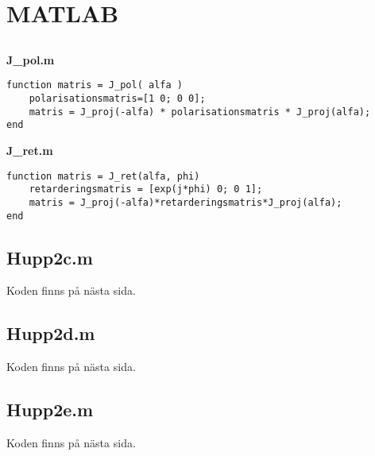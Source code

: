 \documentclass{article}
\begin{document}
\section{MATLAB}
\setcounter{subsection}{1}
\subsection{}
\textbf{J\_pol.m}
    \begin{Verbatim}
function matris = J_pol( alfa )
	polarisationsmatris=[1 0; 0 0];
	matris = J_proj(-alfa) * polarisationsmatris * J_proj(alfa);
end
\end{Verbatim}
\textbf{J\_ret.m}
    \begin{Verbatim}
function matris = J_ret(alfa, phi)
	retarderingsmatris = [exp(j*phi) 0; 0 1];
	matris = J_proj(-alfa)*retarderingsmatris*J_proj(alfa);
end
\end{Verbatim}
\subsection{Hupp2c.m}
Koden finns på nästa sida.


\subsection{Hupp2d.m}
Koden finns på nästa sida.


\subsection{Hupp2e.m}
Koden finns på nästa sida.

\end{document}
